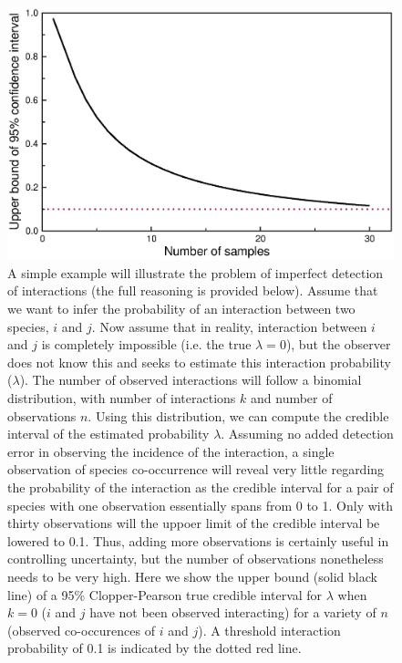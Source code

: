 \documentclass[12pt]{article}
\begin{document}




  \begin{figure}[h!]
    \caption{A simple example will illustrate the problem of imperfect detection of interactions (the full reasoning is provided below). Assume that we want to infer the probability of an interaction between two species, $i$ and $j$. Now assume that in reality, interaction between $i$ and $j$ is completely impossible (i.e. the true $\lambda=0$), but the observer does not know this and seeks to estimate this interaction probability ($\lambda$). The number of observed interactions will follow a binomial distribution, with number of interactions $k$ and number of observations $n$. Using this distribution, we can compute the credible interval of the estimated probability $\lambda$. Assuming no added detection error in observing the incidence of the interaction, a single observation of species co-occurrence will reveal very little regarding the probability of the interaction as the credible interval for a pair of species with one observation essentially spans from 0 to 1. Only with thirty observations will the uppoer limit of the credible interval be lowered to 0.1. Thus, adding more observations is certainly useful in controlling uncertainty, but the number of observations nonetheless needs to be very high. Here we show the upper bound (solid black line) of a 95\% Clopper-Pearson true credible interval for $\lambda$ when $k=0$ ($i$ and $j$ have not been observed interacting) for a variety of $n$ (observed co-occurences of $i$ and $j$). A threshold interaction probability of 0.1 is indicated by the dotted red line.    }
    \label{upper_limits}
    \includegraphics*[width=.8\textwidth]{figures/upper_limit_DG.eps}
  \end{figure}
\end{document}
